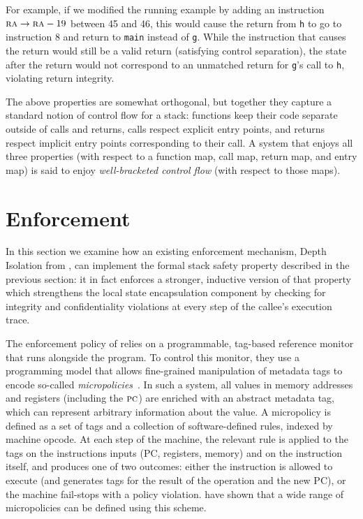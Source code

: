 \documentclass[acmsmall,review,anonymous]{acmart}\settopmatter{printfolios=true,printccs=false,printacmref=false}
\begin{document}
{For example, if we modified the running example by adding
an instruction $ \textsc{ra} \rightarrow \textsc{ra} - 19$
between 45 and 46, this would cause the return from {\tt h} to go to instruction 8 and
return to {\tt main} instead of {\tt g}. While the instruction that
causes the return would still be a valid return (satisfying control
separation), the state after the return would not correspond to an
unmatched return for {\tt g}'s call to {\tt h}, violating return
integrity.


The above properties are somewhat orthogonal, but together they
capture a standard notion of control flow for a stack: functions keep
their code separate outside of calls and returns, calls respect
explicit entry points, and returns respect implicit entry points
corresponding to their call.  A system that enjoys all three
properties (with respect to a function map, call map, return map,
and entry map) is said to enjoy
{\em well-bracketed control flow} (with respect to those maps).


\section{Enforcement}
\label{sec:enforcement}

In this section we examine how an existing enforcement mechanism,
Depth Isolation from \citet{DBLP:conf/sp/RoesslerD18}, can implement
the formal stack safety property described in the previous section: it in
fact enforces a stronger, inductive version of that property which strengthens the
local state encapsulation component by checking for integrity and
confidentiality violations at every step of the callee's execution trace.

%
The enforcement policy of \citeauthor{DBLP:conf/sp/RoesslerD18} relies
on a programmable, tag-based reference monitor that runs alongside the
program.  To control this monitor, they use a programming model that
allows fine-grained manipulation of metadata tags to encode so-called
\emph{micropolicies}~\citep{pump_oakland2015}.
In such a system, all values in
memory addresses and registers (including the $\textsc{pc}$)
are enriched with an abstract metadata tag, which can represent 
arbitrary information about the value. A micropolicy is defined as a set of tags and a
collection of software-defined rules, indexed by machine opcode. 
At each step of the machine, the relevant rule is applied to the tags on 
the instructions inputs (PC, registers, memory) and on the instruction itself, and produces
one of two outcomes: either the instruction is allowed to execute (and generates
tags for the result of the operation and the new PC), or the machine
fail-stops with a policy violation. 
\citeauthor{pump_oakland2015} have shown that a wide range of micropolicies can
be defined using this scheme.

}
\end{document}
